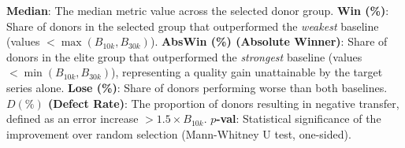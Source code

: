 \begin{table}[t]
\begin{justify}
\textbf{Median}: The median metric value across the selected donor group. 
\textbf{Win (\%)}: Share of donors in the selected group that outperformed the \textit{weakest} baseline (values $< \max(B_{10k}, B_{30k})$). 
\textbf{AbsWin (\%) (Absolute Winner)}: Share of donors in the elite group that outperformed the \textit{strongest} baseline (values $< \min(B_{10k}, B_{30k})$), representing a quality gain unattainable by the target series alone. 
\textbf{Lose (\%)}: Share of donors performing worse than both baselines. 
\textbf{$D (\%)$ (Defect Rate)}: The proportion of donors resulting in negative transfer, defined as an error increase $> 1.5 \times B_{10k}$. 
\textbf{$p$-val}: Statistical significance of the improvement over random selection (Mann-Whitney U test, one-sided).
\end{justify}
\end{table}